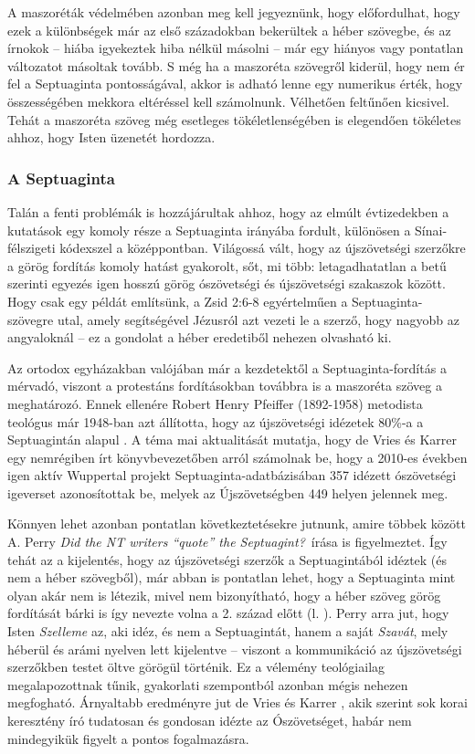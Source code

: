 \documentclass{article}
\newcommand\hu{\selectlanguage{magyar}\frenchspacing}
\newcommand\en{\selectlanguage{english}\frenchspacing}
\begin{document}
A maszoréták védelmében azonban meg kell jegyeznünk, hogy előfordulhat,
hogy ezek a különbségek már az első századokban bekerültek a héber szövegbe, és
az írnokok -- hiába igyekeztek hiba nélkül másolni -- már egy hiányos vagy pontatlan
változatot másoltak tovább. S még ha a maszoréta szövegről kiderül, hogy nem ér fel
a Septuaginta pontosságával, akkor is adható lenne egy numerikus érték, hogy összességében mekkora
eltéréssel kell számolnunk. Vélhetően feltűnően kicsivel. Tehát a maszoréta szöveg
még esetleges tökéletlenségében is elegendően tökéletes ahhoz, hogy Isten üzenetét hordozza.

\subsubsection{A Septuaginta}

Talán a fenti problémák is hozzájárultak ahhoz, hogy
az elmúlt évtizedekben a kutatások egy komoly része a Septuaginta irányába fordult,
különösen a Sínai-félszigeti kódexszel a középpontban. Világossá vált, hogy
az újszövetségi szerzőkre a görög fordítás komoly hatást gyakorolt, sőt, mi több:
letagadhatatlan a betű szerinti egyezés igen hosszú görög ószövetségi és
újszövetségi szakaszok között. Hogy csak egy példát említsünk, a Zsid 2:6-8
egyértelműen a Septuaginta-szövegre utal, amely segítségével Jézusról azt vezeti le
a szerző, hogy nagyobb az angyaloknál -- ez a gondolat a héber eredetiből nehezen olvasható ki.

Az ortodox egyházakban valójában már a kezdetektől a Septuaginta-fordítás a mérvadó,
viszont a protestáns fordításokban továbbra is a maszoréta szöveg a meghatározó.
Ennek ellenére Robert Henry Pfeiffer (1892-1958) metodista teológus már 1948-ban azt állította, hogy
az újszövetségi idézetek 80\%-a a Septuagintán alapul \cite{Pfeiffer}. A téma mai aktualitását
mutatja, hogy
de Vries és Karrer egy nemrégiben írt könyvbevezetőben \cite[3. o.]{deVriesKarrer} arról számolnak be,
hogy a 2010-es években igen aktív Wuppertal projekt Septuaginta-adatbázisában 357 idézett ószövetségi igeverset
azonosítottak be,
melyek az Újszövetségben 449 helyen jelennek meg.

Könnyen lehet azonban pontatlan következtetésekre
jutnunk, amire többek között A. Perry \en\textit{Did the NT writers ``quote''
the Septuagint?}\hu\ írása \cite{Perry} is figyelmeztet. Így tehát az a kijelentés, hogy
az újszövetségi szerzők a Septuagintából idéztek (és nem a héber szövegből), már
abban is pontatlan lehet, hogy a Septuaginta mint olyan akár nem is létezik, mivel nem bizonyítható,
hogy a héber szöveg görög fordítását bárki is így nevezte volna a 2. század előtt (l.
\cite[32., 89. o.]{JobesSilva}). Perry arra jut, hogy Isten \textit{Szelleme} az, aki idéz, és nem a Septuagintát,
hanem a saját \textit{Szavát}, mely héberül és arámi nyelven lett kijelentve -- viszont a kommunikáció az újszövetségi szerzőkben
testet öltve görögül történik. Ez a vélemény teológiailag megalapozottnak tűnik,
gyakorlati szempontból azonban mégis nehezen megfogható. Árnyaltabb eredményre jut de Vries és Karrer \cite[16. o.]{deVriesKarrer},
akik szerint sok korai keresztény író tudatosan és gondosan idézte az Ószövetséget, habár nem mindegyikük
figyelt a pontos fogalmazásra.
\end{document}
